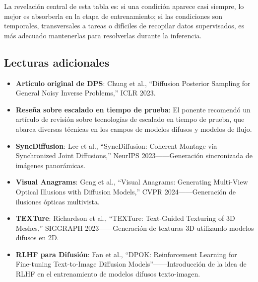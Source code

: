 La revelación central de esta tabla es: si una condición aparece casi siempre, lo mejor es absorberla en la etapa de entrenamiento; si las condiciones son temporales, transversales a tareas o difíciles de recopilar datos supervisados, es más adecuado mantenerlas para resolverlas durante la inferencia.

\subsection{Lecturas adicionales}

\begin{itemize}
    \item \textbf{Artículo original de DPS}: Chung et al., ``Diffusion Posterior Sampling for General Noisy Inverse Problems,'' ICLR 2023.
    \item \textbf{Reseña sobre escalado en tiempo de prueba}: El ponente recomendó un artículo de revisión sobre tecnologías de escalado en tiempo de prueba, que abarca diversas técnicas en los campos de modelos difusos y modelos de flujo.
    \item \textbf{SyncDiffusion}: Lee et al., ``SyncDiffusion: Coherent Montage via Synchronized Joint Diffusions,'' NeurIPS 2023——Generación sincronizada de imágenes panorámicas.
    \item \textbf{Visual Anagrams}: Geng et al., ``Visual Anagrams: Generating Multi-View Optical Illusions with Diffusion Models,'' CVPR 2024——Generación de ilusiones ópticas multivista.
    \item \textbf{TEXTure}: Richardson et al., ``TEXTure: Text-Guided Texturing of 3D Meshes,'' SIGGRAPH 2023——Generación de texturas 3D utilizando modelos difusos en 2D.
    \item \textbf{RLHF para Difusión}: Fan et al., ``DPOK: Reinforcement Learning for Fine-tuning Text-to-Image Diffusion Models''——Introducción de la idea de RLHF en el entrenamiento de modelos difusos texto-imagen.
\end{itemize}



